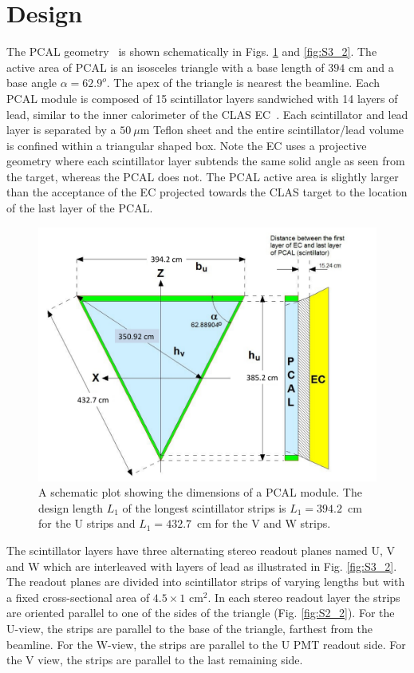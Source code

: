 \section{Design} \label{Design}

The PCAL geometry~\cite{2015002} is shown schematically in Figs. \ref{fig:S3_1} and \ref{fig:S3_2}.   The active area of PCAL is an isosceles triangle with a base length of $394$ cm and a base angle $\alpha=62.9^o$. The apex of the triangle is nearest the beamline. Each PCAL module is composed of 15 scintillator layers sandwiched with 14 layers of lead, similar to the inner calorimeter of the CLAS EC~\cite{clas6nim}.  Each scintillator and lead layer is separated by a $50~\mu$m Teflon sheet and the entire scintillator/lead volume is confined within a triangular shaped box. Note the EC uses a projective geometry where each scintillator layer subtends the same solid angle as seen from the target, whereas the PCAL does not.  The PCAL active area is slightly larger than the acceptance of the EC projected towards the CLAS target to the location of the last layer of the PCAL. 

\begin{figure}[h]
\centering
\includegraphics[width=1.0\columnwidth,keepaspectratio]{img/S3_1.pdf}
\caption[Schematic plot of PCAL]{A schematic plot showing the dimensions of a PCAL module. The design length $L_1$ of the longest scintillator strips is $L_1=394.2$~cm for the U strips and $L_1=432.7$~cm for the V and W strips. }
\label{fig:S3_1}
\end{figure}

The scintillator layers have three alternating stereo readout planes named U, V and W which are interleaved with layers of lead as illustrated in Fig. \ref{fig:S3_2}. The readout planes are divided into scintillator strips of varying lengths but with a fixed cross-sectional area of $4.5 \times 1$ cm$^2$. In each stereo readout layer the strips are oriented parallel to one of the sides of the triangle (Fig. \ref{fig:S2_2}). For the U-view, the strips are parallel to the base of the triangle, farthest from the beamline. For the W-view, the strips are parallel to the U PMT readout side.  For the V view, the strips are parallel to the last remaining side.  

